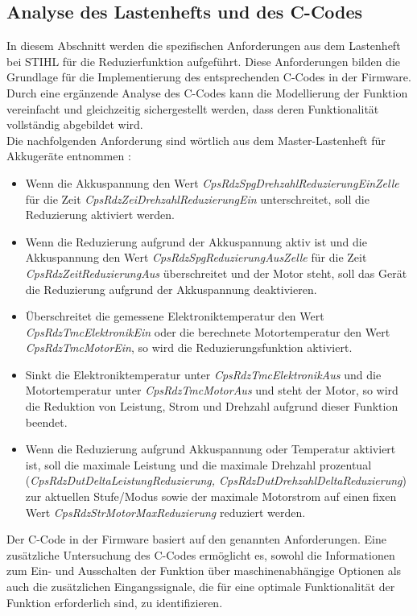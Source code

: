 \subsection{Analyse des Lastenhefts und des C-Codes}
\label{subsec_red_analyse}
In diesem Abschnitt werden die spezifischen Anforderungen aus dem Lastenheft bei STIHL für die Reduzierfunktion aufgeführt. Diese Anforderungen bilden die Grundlage für die Implementierung des entsprechenden C-Codes in der Firmware. Durch eine ergänzende Analyse des C-Codes kann die Modellierung der Funktion vereinfacht und gleichzeitig sichergestellt werden, dass deren Funktionalität vollständig abgebildet wird. \\
Die nachfolgenden Anforderung sind wörtlich aus dem Master-Lastenheft für Akkugeräte entnommen \cite{Lastenheft}:
\begin{itemize}
\item Wenn die Akkuspannung den Wert \textit{CpsRdzSpgDrehzahlReduzierungEinZelle} für die Zeit \textit{CpsRdzZeiDrehzahlReduzierungEin} unterschreitet, soll die Reduzierung aktiviert werden.
\item Wenn die Reduzierung aufgrund der Akkuspannung aktiv ist und die Akkuspannung den Wert \textit{CpsRdzSpgReduzierungAusZelle} für die Zeit \textit{CpsRdzZeitReduzierungAus} überschreitet und der Motor steht, soll das Gerät die Reduzierung aufgrund der Akkuspannung deaktivieren.
\item Überschreitet die gemessene Elektroniktemperatur den Wert \textit{CpsRdzTmcElektronikEin} oder die berechnete Motortemperatur den Wert \textit{CpsRdzTmcMotorEin}, so wird die Reduzierungsfunktion aktiviert.
\item Sinkt die Elektroniktemperatur unter \textit{CpsRdzTmcElektronikAus} und die Motortemperatur unter \textit{CpsRdzTmcMotorAus} und steht der Motor, so wird die Reduktion von Leistung, Strom und Drehzahl aufgrund dieser Funktion beendet.
\item Wenn die Reduzierung aufgrund Akkuspannung oder Temperatur aktiviert ist, soll die maximale Leistung und die maximale Drehzahl prozentual (\textit{CpsRdzDutDeltaLeistungReduzierung, CpsRdzDutDrehzahlDeltaReduzierung}) zur aktuellen Stufe/Modus sowie der maximale Motorstrom auf einen fixen Wert \textit{CpsRdzStrMotorMaxReduzierung} reduziert werden.
\end{itemize}
Der C-Code in der Firmware basiert auf den genannten Anforderungen. Eine zusätzliche Untersuchung des C-Codes ermöglicht es, sowohl die Informationen zum Ein- und Ausschalten der Funktion über maschinenabhängige Optionen als auch die zusätzlichen Eingangssignale, die für eine optimale Funktionalität der Funktion erforderlich sind, zu identifizieren. \\

